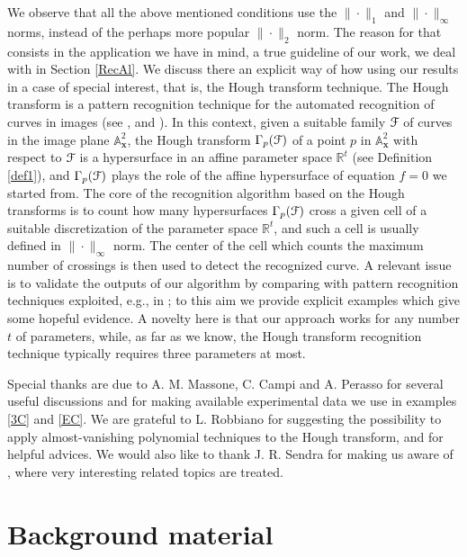 \documentclass[10pt]{article}
\newcommand\sF{{\cal F}}
\newcommand{\x}{{\bm x}}
\newcommand\R{{\mathbb R}}
\begin{document}
We observe that all the above mentioned conditions use the $\| \cdot\|_1$ and  $\|\cdot \|_\infty$ norms, instead of the perhaps more popular $\| \cdot \|_2$ norm. The reason for that consists in the application we have in mind,  a true guideline of our work, we deal with   
in Section \ref{RecAl}. We discuss there an explicit way of how using 
 our results in a case of special interest, 
that is,  the Hough transform technique. The Hough transform is a pattern recognition technique  for the automated recognition of curves in images
(see \cite{DH},  \cite{BMP} and  \cite{BR}). In this context, 
given a suitable family $\sF$  of curves in the image plane ${\mathbb A}_{\x}^2$,
 the Hough transform $\Gamma_p(\sF)$
 of a point $p$ in  ${\mathbb A}_{\x}^2$ with respect to $\sF$ is a hypersurface in an affine parameter space $\R^t$ (see Definition \ref{def1}), and  
 $\Gamma_p(\sF)$ plays the role of the affine hypersurface of equation $f=0$  we started from. The core of the recognition algorithm based on the Hough transforms is to count   how many hypersurfaces $\Gamma_p(\sF)$  cross a given cell of a suitable discretization of the parameter space  $\R^t$, and such a  cell is  usually defined in   $\|\cdot \|_\infty$ norm. The center of the cell which counts the maximum number of crossings is then  used to detect the recognized curve.
A relevant issue is  to validate  the outputs of our algorithm  by comparing with pattern recognition techniques exploited, e.g.,  in \cite{etal}; to this aim we provide  explicit examples which give some hopeful evidence.  A novelty here is that our approach works for any number $t$ of parameters, while, as far as we know,  the Hough transform recognition technique typically  requires  three parameters at most.


\smallskip
Special thanks are due  to A. M. Massone, 
C. Campi and  A. Perasso for  several useful discussions and  for making available experimental data we use in examples \ref{3C} and \ref{EC}. 
We are grateful to L. Robbiano for  suggesting  the possibility  to apply almost-vanishing polynomial techniques to the  Hough transform, 
and for helpful advices.  We would also like to thank J. R. Sendra for making us aware of  \cite{Sendra}, where very interesting related topics are treated.



 
\section{Background material}\label{Back}
\addtocounter{subsection}{1}\setcounter{theorem}{0}
\end{document}
